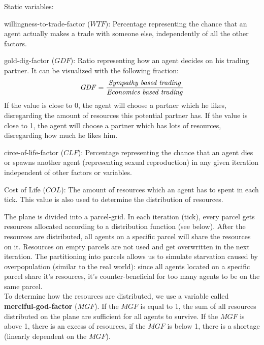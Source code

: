 \documentclass{JASSS}
\newcommand{\gdf}{\mathit{GDF}}
\newcommand{\wtf}{\mathit{WTF}}
\newcommand{\clf}{\mathit{CLF}}
\newcommand{\col}{\mathit{COL}}
\newcommand{\mgf}{\mathit{MGF}}
\begin{document}
Static variables:
\begin{description*}
	\item[willingness-to-trade-factor ($\wtf$):]
		Percentage representing the chance that an agent actually makes a trade with someone else, independently of all the other factors.

	\item[gold-dig-factor ($\gdf$):]
		Ratio representing how an agent decides on his trading partner. It can be visualized with the following fraction:
		\begin{equation*}
			\gdf = \frac{\text{\textit{Sympathy based trading}}}{\text{\textit{Economics based trading}}}
		\end{equation*}
		If the value is close to 0, the agent will choose a partner which he likes, disregarding the amount of resources this potential partner has. If the value is close to 1, the agent will choose a partner which has lots of resources, disregarding how much he likes him.

	\item[circe-of-life-factor ($\clf$):]
		Percentage representing the chance that an agent dies or spawns another agent (representing sexual reproduction) in any given iteration independent of other factors or variables.
		
	\item[Cost of Life ($\col$):]
		The amount of resources which an agent has to spent in each tick. This value is also used to determine the distribution of resources.
\end{description*}

The plane is divided into a parcel-grid. In each iteration (tick), every parcel gets resources allocated according to a distribution function (see below). After the resources are distributed, all agents on a specific parcel will share the resources on it. Resources on empty parcels are not used and get overwritten in the next iteration. The partitioning into parcels allows us to simulate starvation caused by overpopulation (similar to the real world): since all agents located on a specific parcel share it's resources, it's counter-beneficial for too many agents to be on the same parcel.\\

To determine how the resources are distributed, we use a variable called \textbf{merciful-god-factor} ($\mgf$). If the $\mgf$ is equal to 1, the sum of all resources distributed on the plane are sufficient for all agents to survive. If the $\mgf$ is above 1, there is an excess of resources, if the $\mgf$ is below 1, there is a shortage (linearly dependent on the $\mgf$).
\end{document}
